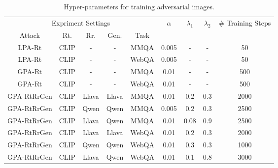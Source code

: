 \begin{table*}[h]
    \centering
    \begin{tabular}{c c c c c| c c c c }
    \toprule
        \multicolumn{5}{c}{Expriment Settings} & $\alpha$ & $\lambda_1$ &$\lambda_2$ & \# Training Steps \\
        Attack & Rt. & Rr. & Gen. & Task\\
        \midrule
        LPA-Rt & CLIP & - & - & MMQA&0.005&-&-&50 \\
        LPA-Rt & CLIP & - & - & WebQA&0.005&-&-&50 \\
        GPA-Rt & CLIP & - & - &MMQA&0.01&-&-& 500\\
        GPA-Rt & CLIP & - & - &WebQA&0.01&-&-&500 \\
        GPA-RtRrGen& CLIP& Llava &Llava &MMQA & 0.01&0.2&0.3&2000\\
                GPA-RtRrGen& CLIP& Qwen &Qwen &MMQA & 0.005&0.2&0.3&2500 \\
                GPA-RtRrGen& CLIP& Llava &Qwen &MMQA & 0.01&0.08&0.9&2500\\
        GPA-RtRrGen& CLIP& Llava &Llava &WebQA & 0.01&0.2&0.3&2000\\
                GPA-RtRrGen& CLIP& Qwen &Qwen &WebQA & 0.01&0.3&0.3&1000\\
                GPA-RtRrGen& CLIP& Llava &Qwen &WebQA & 0.01&0.1&0.8&3000\\
         \bottomrule
    \end{tabular}%
    \caption{Hyper-parameters for training adversarial images.}
    \vspace{-0.1in}
    \label{tab:hyper_parameters}
\end{table*}

